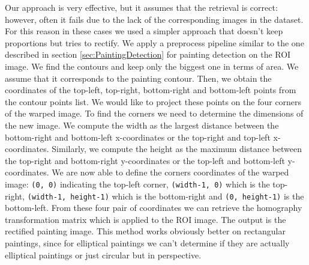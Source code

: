 \documentclass[10pt,twocolumn,letterpaper]{article}
\begin{document}
Our approach is very effective, but it assumes that the retrieval is correct: however, often it fails due to the lack of the corresponding images in the dataset. For this reason in these cases we used a simpler approach that doesn’t keep proportions but tries to rectify.
We apply a preprocess pipeline similar to the one described in section \ref{sec:PaintingDetection} for painting detection on the ROI image. We find the contours and keep only the biggest one in terms of area. We assume that it corresponds to the painting contour. Then, we obtain the coordinates of the top-left, top-right, bottom-right and bottom-left points from the contour points list. 
We would like to project these points on the four corners of the warped image. To find the corners we need to determine the dimensions of the new image. We compute the width as the largest distance between the bottom-right and bottom-left x-coordinates or the top-right and top-left x-coordinates. Similarly, we compute the height as the maximum distance between the top-right and bottom-right y-coordinates or the top-left and bottom-left y-coordinates.  
We are now able to define the corners coordinates of the warped image: \texttt{(0, 0)} indicating the top-left corner, \texttt{(width-1, 0)} which is the top-right, \texttt{(width-1, height-1)} which is the bottom-right and \texttt{(0, height-1)} is the bottom-left.
From these four pair of coordinates we can retrieve the homography transformation matrix which is applied to the ROI image. The output is the rectified painting image.
This method works obviously better on rectangular paintings, since for elliptical paintings we can't determine if they are actually elliptical paintings or just circular but in perspective.
\end{document}
